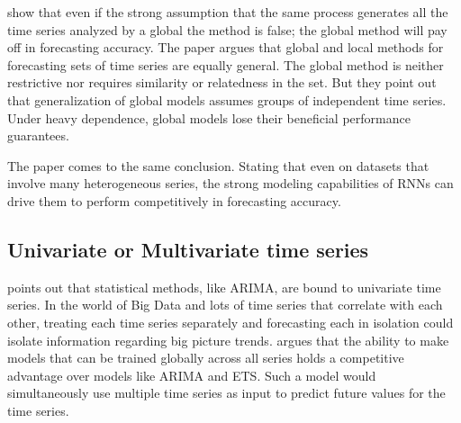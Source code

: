 


\cite{Montero-Manso2021} show that even if the strong assumption that the same process generates all the time series analyzed by a global
the method is false; the global method will pay off in forecasting accuracy.
The paper argues that global and local methods for forecasting
sets of time series are equally general. The global method is neither restrictive nor requires
similarity or relatedness in the set.
But they point out that generalization of global models assumes groups of independent time series.
Under heavy dependence, global models lose their beneficial performance guarantees.

The paper \cite{Hewamalage2021} comes to the same conclusion. Stating that
even on datasets that involve many heterogeneous series, the strong modeling capabilities of RNNs can drive
them to perform competitively in forecasting accuracy.

\subsection{Univariate or Multivariate time series}
\cite{Bandara2017} points out that statistical methods, like ARIMA, are bound to
univariate time series. In the world of Big Data and lots of time series that correlate with each other,
treating each time series separately and forecasting each in isolation could isolate information regarding big picture trends.
\cite{Bandara2017} argues that the ability to make models that can be trained globally across all series
holds a competitive advantage over models like ARIMA and ETS.
Such a model would simultaneously use multiple time series as input to predict future values for the time series.

